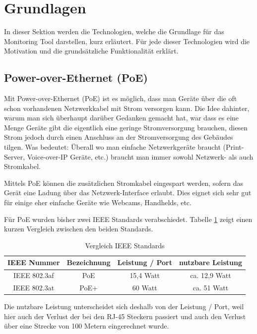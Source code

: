 \section{Grundlagen}
\label{sec:basics}

In dieser Sektion werden die Technologien, welche die Grundlage für das Monitoring Tool darstellen, kurz erläutert. Für jede dieser Technologien wird die Motivation und die grundsätzliche Funktionalität erklärt.

\subsection{Power-over-Ethernet (PoE)}

Mit Power-over-Ethernet (PoE) ist es möglich, dass man Geräte über die oft schon vorhandenen Netzwerkkabel mit Strom versorgen kann. Die Idee dahinter, warum man sich überhaupt darüber Gedanken gemacht hat, war dass es eine Menge Geräte gibt die eigentlich eine geringe Stromversorgung brauchen, diesen Strom jedoch durch einen Anschluss an der Stromversorgung des Gebäudes tilgen. Was bedeutet: Überall wo man einfache Netzwerkgeräte braucht (Print-Server, Voice-over-IP Geräte, etc.) braucht man immer sowohl Netzwerk- als auch Stromkabel.

Mittels PoE können die zusätzlichen Stromkabel eingespart werden, sofern das Gerät eine Ladung über das Netzwerk-Interface erlaubt. Dies eignet sich sehr gut für einige eher einfache Geräte wie Webcams, Handhelds, etc.

Für PoE wurden bisher zwei IEEE Standards verabschiedet. Tabelle \ref{tab:compareIeee} zeigt einen kurzen Vergleich zwischen den beiden Standards.

\begin{table}[h]
 \centering
 \begin{tabular}{|c|c|c|c|}
   \hline
   \textbf{IEEE Nummer} & \textbf{Bezeichnung} & \textbf{Leistung / Port} & \textbf{nutzbare Leistung} \\
   \hline
   IEEE 802.3af & PoE & 15,4 Watt & ca. 12,9 Watt \\
   \hline
   IEEE 802.3at & PoE+ & 60 Watt & ca. 51 Watt \\
   \hline
 \end{tabular}
 \caption{Vergleich IEEE Standards \cite{poe2}}
 \label{tab:compareIeee}
\end{table}

Die nutzbare Leistung unterscheidet sich deshalb von der Leistung / Port, weil hier auch der Verlust der bei den RJ-45 Steckern passiert und auch den Verlust über eine Strecke von 100 Metern eingerechnet wurde.

